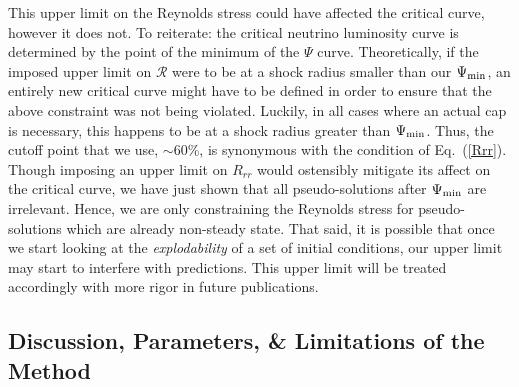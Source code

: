 \documentclass[twocolumn]{aastex6}
\begin{document}
This upper limit on the Reynolds stress could have affected the
critical curve, however it does not. To reiterate: the critical
neutrino luminosity curve is determined by the point of the minimum of
the $\Psi$ curve. Theoretically, if the imposed upper limit on
$\mathcal{R}$ were to be at a shock radius smaller than our $\Psi_{\rm
  min}$, an entirely new critical curve might have to be defined in
order to ensure that the above constraint was not
being violated. Luckily, in all cases where an actual cap is
necessary, this happens to be at a shock radius greater than
$\Psi_{\rm min}$. Thus, the cutoff point that we use, $\sim$60\%, is
synonymous with the condition of Eq.~(\ref{Rrr}). Though imposing an
upper limit on $R_{rr}$ would ostensibly mitigate its affect on the
critical curve, we have just shown that all pseudo-solutions after
$\Psi_{\rm min}$ are irrelevant. Hence, we are only constraining the
Reynolds stress for pseudo-solutions which are already non-steady
state. That said, it is possible that once we start looking at the
\textit{explodability} of a set of initial conditions, our upper limit
may start to interfere with predictions. This upper limit will be treated accordingly with more rigor in future publications. 

\subsection{Discussion, Parameters, \& Limitations of the Method}
\label{Parameters}




\end{document}
